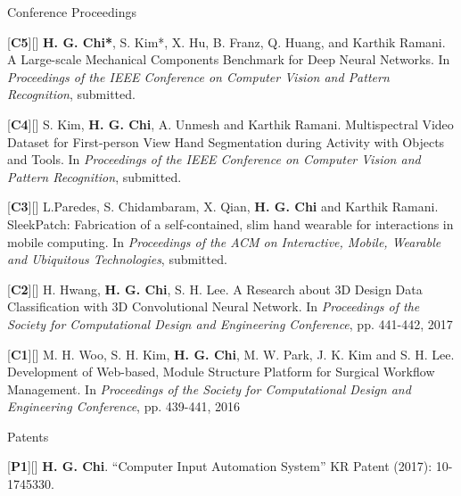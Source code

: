 \begin{cventries}
\cvpub
{Conference Proceedings} %
{ %
\begin{cvitems}
\item {[\textbf{C5}][\href{https://docs.google.com/viewer?url=https://github.com/stnoah1/CV/raw/master/documents/MCB.pdf}{}] \textbf{H. G. Chi*}, S. Kim*, X. Hu, B. Franz, Q. Huang, and Karthik Ramani. A Large-scale Mechanical Components Benchmark for Deep Neural Networks. In \textit{Proceedings of the IEEE Conference on Computer Vision and Pattern Recognition}, submitted.}
\item {[\textbf{C4}][\href{https://docs.google.com/viewer?url=https://github.com/stnoah1/CV/raw/master/documents/RGBDT.pdf}{}] S. Kim, \textbf{H. G. Chi}, A. Unmesh and Karthik Ramani. Multispectral Video Dataset for First-person View Hand Segmentation during Activity with Objects and Tools. In \textit{Proceedings of the IEEE Conference on Computer Vision and Pattern Recognition}, submitted.}
\item {[\textbf{C3}][\href{https://docs.google.com/viewer?url=https://github.com/stnoah1/CV/raw/master/documents/SleekPatch.pdf}{}] L.Paredes, S. Chidambaram, X. Qian, \textbf{H. G. Chi} and Karthik Ramani. SleekPatch: Fabrication of a self-contained, slim hand wearable for interactions in mobile computing. In \textit{Proceedings of the ACM on Interactive, Mobile, Wearable and Ubiquitous Technologies}, submitted.}
\item {[\textbf{C2}][\href{https://docs.google.com/viewer?url=https://github.com/stnoah1/CV/raw/master/documents/3DM.pdf}{}] H. Hwang, \textbf{H. G. Chi}, S. H. Lee. A Research about 3D Design Data Classification with 3D Convolutional Neural Network. In \textit{Proceedings of the Society for Computational Design and Engineering Conference}, pp. 441-442, 2017}
\item {[\textbf{C1}][\href{https://docs.google.com/viewer?url=https://github.com/stnoah1/CV/raw/master/documents/SWORM.pdf}{}] M. H. Woo, S. H. Kim, \textbf{H. G. Chi}, M. W. Park, J. K. Kim and S. H. Lee. Development of Web-based, Module Structure Platform for Surgical Workflow Management. In \textit{Proceedings of the Society for Computational Design and Engineering Conference}, pp. 439-441, 2016}
\end{cvitems}
}


\cvpub
{Patents}{
\begin{cvitems}
\item {[\textbf{P1}][\href{https://docs.google.com/viewer?url=https://github.com/stnoah1/CV/raw/master/documents/patent.pdf}{}] \textbf{H. G. Chi}.  “Computer Input Automation System” KR Patent (2017): 10-1745330.}
\end{cvitems}
}



\end{cventries}
